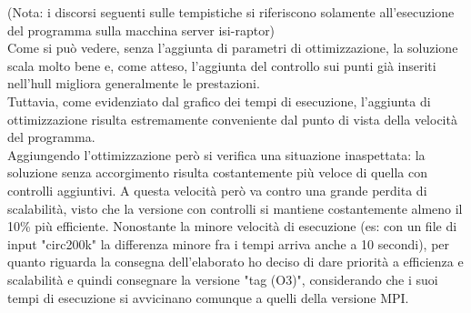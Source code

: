 \documentclass[a4paper, 12pt]{article}
\begin{document}
    (Nota: i discorsi seguenti sulle tempistiche si riferiscono solamente all'esecuzione del programma sulla macchina server isi-raptor) \\
    Come si può vedere, senza l'aggiunta di parametri di ottimizzazione, la soluzione scala molto bene e, come atteso, l'aggiunta del controllo sui punti già inseriti nell'hull migliora generalmente le prestazioni.\\
    Tuttavia, come evidenziato dal grafico dei tempi di esecuzione, l'aggiunta di ottimizzazione risulta estremamente conveniente dal punto di vista della velocità del programma. \\
    Aggiungendo l'ottimizzazione però si verifica una situazione inaspettata: la soluzione senza accorgimento risulta costantemente più veloce di quella con controlli aggiuntivi.
    A questa velocità però va contro una grande perdita di scalabilità, visto che la versione con controlli si mantiene costantemente almeno il 10\% più efficiente.
    Nonostante la minore velocità di esecuzione (es: con un file di input "circ200k" la differenza minore fra i tempi arriva anche a 10 secondi), per quanto riguarda la consegna dell'elaborato ho deciso di dare priorità
    a efficienza e scalabilità e quindi consegnare la versione "tag (O3)", considerando che i suoi tempi di esecuzione si avvicinano comunque a quelli della versione MPI.\\
\end{document}
